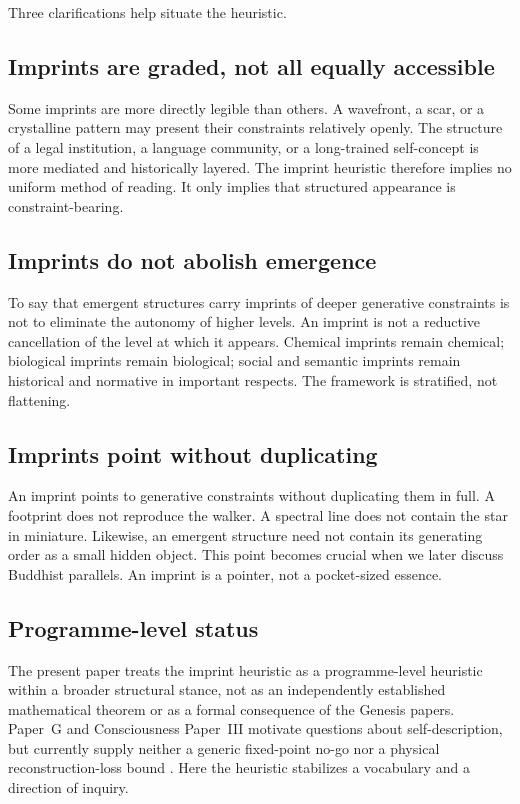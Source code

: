 \documentclass[12pt,a4paper]{article}
\begin{document}
Three clarifications help situate the heuristic.

\subsection{Imprints are graded, not all equally accessible}

Some imprints are more directly legible than others. A wavefront, a scar, or a crystalline pattern may present their constraints relatively openly. The structure of a legal institution, a language community, or a long-trained self-concept is more mediated and historically layered. The imprint heuristic therefore implies no uniform method of reading. It only implies that structured appearance is constraint-bearing.

\subsection{Imprints do not abolish emergence}

To say that emergent structures carry imprints of deeper generative constraints is not to eliminate the autonomy of higher levels. An imprint is not a reductive cancellation of the level at which it appears. Chemical imprints remain chemical; biological imprints remain biological; social and semantic imprints remain historical and normative in important respects. The framework is stratified, not flattening.

\subsection{Imprints point without duplicating}

An imprint points to generative constraints without duplicating them in full. A footprint does not reproduce the walker. A spectral line does not contain the star in miniature. Likewise, an emergent structure need not contain its generating order as a small hidden object. This point becomes crucial when we later discuss Buddhist parallels. An imprint is a pointer, not a pocket-sized essence.

\subsection{Programme-level status}

The present paper treats the imprint heuristic as a programme-level
heuristic within a broader structural stance, not as an independently
established mathematical theorem or as a formal consequence of the
Genesis papers. Paper~G and Consciousness Paper~III motivate questions
about self-description, but currently supply neither a generic
fixed-point no-go nor a physical reconstruction-loss bound
\cite{Liu2026HAFF_G,Liu2026CS_III}. Here the heuristic stabilizes a
vocabulary and a direction of inquiry.
\end{document}
